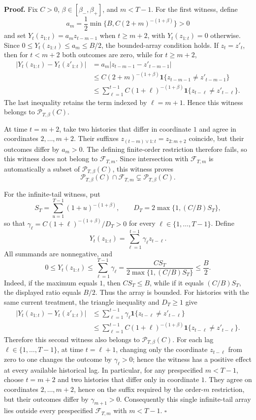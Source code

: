 \textbf{Proof.} Fix \(C>0\), \(\beta\in[\beta_-,\beta_+]\), and \(m<T-1\). For the first witness, define
\[
a_m=\frac12\min\{B,C(2+m)^{-(1+\beta)}\}>0
\]
and set \(Y_t(z_{1:t})=a_m z_{t-m-1}\) when \(t\ge m+2\), with \(Y_t(z_{1:t})=0\) otherwise. Since \(0\le Y_t(z_{1:t})\le a_m\le B/2\), the bounded-array condition holds. If \(z_t=z'_t\), then for \(t<m+2\) both outcomes are zero, while for \(t\ge m+2\),
\[
\begin{aligned}
\left|Y_t(z_{1:t})-Y_t(z'_{1:t})\right|
&=a_m\left|z_{t-m-1}-z'_{t-m-1}\right|\\
&\le C(2+m)^{-(1+\beta)}\mathbf 1\{z_{t-m-1}\ne z'_{t-m-1}\}\\
&\le \sum_{\ell=1}^{t-1}C(1+\ell)^{-(1+\beta)}\mathbf 1\{z_{t-\ell}\ne z'_{t-\ell}\}.
\end{aligned}
\]
The last inequality retains the term indexed by \(\ell=m+1\). Hence this witness belongs to \(\mathcal P_{T,\beta}(C)\).

At time \(t=m+2\), take two histories that differ in coordinate \(1\) and agree in coordinates \(2,\ldots,m+2\). Their suffixes \(z_{(t-m)\vee1:t}=z_{2:m+2}\) coincide, but their outcomes differ by \(a_m>0\). The defining finite-order restriction therefore fails, so this witness does not belong to \(\mathcal F_{T,m}\). Since intersection with \(\mathcal F_{T,m}\) is automatically a subset of \(\mathcal P_{T,\beta}(C)\), this witness proves
\[
\mathcal P_{T,\beta}(C)\cap\mathcal F_{T,m}\subsetneq\mathcal P_{T,\beta}(C).
\]

For the infinite-tail witness, put
\[
S_T=\sum_{u=1}^{T-1}(1+u)^{-(1+\beta)},
\qquad
D_T=2\max\{1,(C/B)S_T\},
\]
so that \(\gamma_\ell=C(1+\ell)^{-(1+\beta)}/D_T>0\) for every \(\ell\in\{1,\ldots,T-1\}\). Define
\[
Y_t(z_{1:t})=\sum_{\ell=1}^{t-1}\gamma_\ell z_{t-\ell}.
\]
All summands are nonnegative, and
\[
0\le Y_t(z_{1:t})\le\sum_{\ell=1}^{T-1}\gamma_\ell
=\frac{CS_T}{2\max\{1,(C/B)S_T\}}\le\frac B2.
\]
Indeed, if the maximum equals \(1\), then \(CS_T\le B\), while if it equals \((C/B)S_T\), the displayed ratio equals \(B/2\). Thus the array is bounded. For histories with the same current treatment, the triangle inequality and \(D_T\ge1\) give
\[
\begin{aligned}
\left|Y_t(z_{1:t})-Y_t(z'_{1:t})\right|
&\le\sum_{\ell=1}^{t-1}\gamma_\ell\mathbf 1\{z_{t-\ell}\ne z'_{t-\ell}\}\\
&\le\sum_{\ell=1}^{t-1}C(1+\ell)^{-(1+\beta)}\mathbf 1\{z_{t-\ell}\ne z'_{t-\ell}\}.
\end{aligned}
\]
Therefore this second witness also belongs to \(\mathcal P_{T,\beta}(C)\). For each lag \(\ell\in\{1,\ldots,T-1\}\), at time \(t=\ell+1\), changing only the coordinate \(z_{t-\ell}\) from zero to one changes the outcome by \(\gamma_\ell>0\); hence the witness has a positive effect at every available historical lag. In particular, for any prespecified \(m<T-1\), choose \(t=m+2\) and two histories that differ only in coordinate \(1\). They agree on coordinates \(2,\ldots,m+2\), hence on the suffix required by the order-\(m\) restriction, but their outcomes differ by \(\gamma_{m+1}>0\). Consequently this single infinite-tail array lies outside every prespecified \(\mathcal F_{T,m}\) with \(m<T-1\). \(\square\)